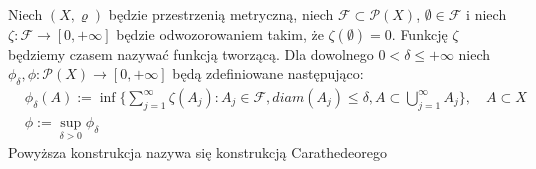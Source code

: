\begin{defi}
Niech $(X, \varrho)$ będzie przestrzenią metryczną, niech $\mathcal{F} \subset \mathcal{P}(X)$,  $\emptyset \in \mathcal{F}$ i niech \newline
$\zeta: \mathcal{F} \rightarrow [0, +\infty]$ będzie odwozorowaniem takim, że $\zeta(\emptyset) = 0$. Funkcję $\zeta$ będziemy czasem nazywać funkcją tworzącą. Dla dowolnego $0 < \delta \leq +\infty$ niech  $\phi_{\delta}, \phi: \mathcal{P}(X) \rightarrow [0, +\infty]$ będą zdefiniowane następująco: 
\begin{align*}
    &\phi_{\delta}(A) := \inf \{
            \sum_{j=1}^{\infty} \zeta(A_j):
            A_j \in \mathcal{F}, diam(A_j) \leq \delta, A \subset \bigcup_{j=1}^{\infty} A_j
        \},
    \quad 
    A \subset X
    \\
    &\phi := \sup_{\delta > 0} \phi_{\delta}
\end{align*}
Powyższa konstrukcja nazywa się konstrukcją Carathedeorego

\end{defi}

